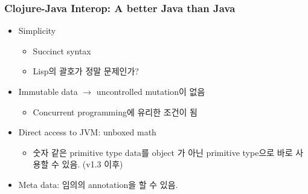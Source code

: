 \begin{frame}
\frametitle{Clojure-Java Interop: A better Java than Java}

\begin{itemize}
\item Simplicity
  \begin{itemize}
  \item Succinct syntax
  \item Lisp의 괄호가 정말 문제인가?
  \end{itemize}

\item Immutable data $\rightarrow$ uncontrolled mutation이 없음
  \begin{itemize}
  \item Concurrent programming에 유리한 조건이 됨
  \end{itemize}

\item Direct access to JVM: unboxed math
  \begin{itemize}
  \item 숫자 같은 primitive type data를 object 가 아닌 primitive
    type으로 바로 사용할 수 있음. (v1.3 이후)
  \end{itemize}

\item Meta data: 임의의 annotation을 할 수 있음.
\end{itemize}


\end{frame}

